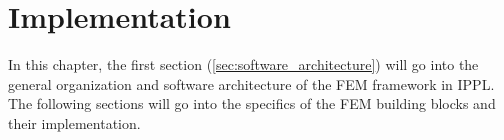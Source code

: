 
\chapter{Implementation}

In this chapter, the first section (\ref{sec:software_architecture}) will go into the general organization
and software architecture of the FEM framework in IPPL. The following sections will go into the specifics
of the FEM building blocks and their implementation.



\clearpage